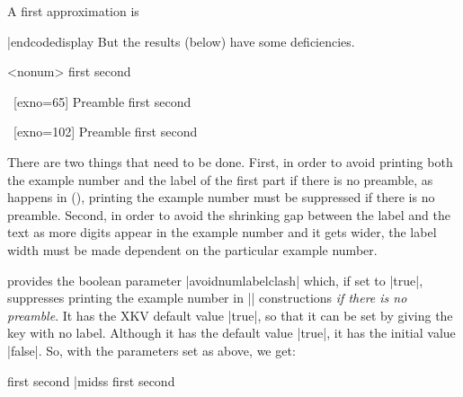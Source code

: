 A first approximation is

\codedisplay
{}
|endcodedisplay
But the results (below) have some deficiencies.

\begingroup
{}
\pex[exno=5]<nonum>
\a first
\a second
\xe

\pex~[exno=65]
Preamble
\a first
\a second
\xe

\pex~[exno=102]
Preamble
\a first
\a second
\xe

There are two things that need to be done.  First, in order to avoid
printing both the example number and the label of the first part if
there is no preamble, as happens in (), printing the
example number must be suppressed if there is no preamble. Second, in
order to avoid the shrinking gap between the label and the text as
more digits appear in the example number and it gets wider, the label
width must be made dependent on the particular example number.

\expex\/ provides the boolean parameter |avoidnumlabelclash|
which, if set to |true|, suppresses printing the example number
in |\pex| constructions {\it if there is no preamble}.  It has
the XKV default value |true|, so that it can be set by giving the
key with no label.  Although it has the default value |true|, it
has the initial value |false|.  So, with the parameters set as
above, we get:

\beginss
\pex[exno=5,avoidnumlabelclash]
\a first
\a second
\xe|midss
\pex[exno=5,avoidnumlabelclash]
\a first
\a second
\xe
\endss

